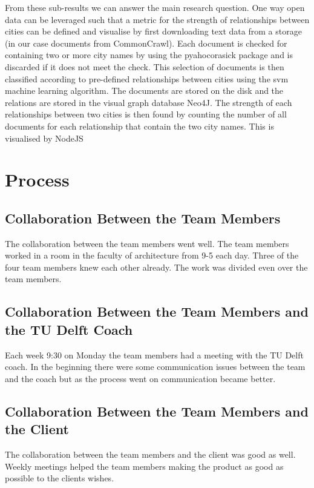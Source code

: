 From these sub-results we can answer the main research question. One way open data can be leveraged such that a metric for the strength of relationships between cities can be defined and visualise by first downloading text data from a storage (in our case documents from CommonCrawl). Each document is checked for containing two or more city names by using the pyahocorasick package and is discarded if it does not meet the check. This selection of documents is then classified according to pre-defined relationships between cities using the svm machine learning algorithm. The documents are stored on the disk and the relations are stored in the visual graph database Neo4J. The strength of each relationships between two cities is then found by counting the number of all documents for each relationship that contain the two city names. This is visualised by NodeJS 

\section{Process}

\subsection{Collaboration Between the Team Members}
The collaboration between the team members went well. The team members worked in a room in the faculty of architecture from 9-5 each day. Three of the four team members knew each other already. The work was divided even over the team members. 

\subsection{Collaboration Between the Team Members and the TU Delft Coach}
Each week 9:30 on Monday the team members had a meeting with the TU Delft coach. In the beginning there were some communication issues between the team and the coach but as the process went on communication became better.

\subsection{Collaboration Between the Team Members and the Client}
The collaboration between the team members and the client was good as well. 
Weekly meetings helped the team members making the product as good as possible to the clients wishes. 